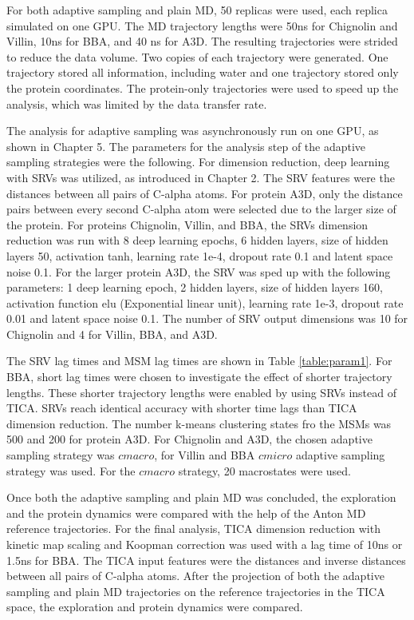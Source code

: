 For both adaptive sampling and plain MD, 50 replicas were used, each replica simulated on one GPU. The MD trajectory lengths were 50ns for Chignolin and Villin, 10ns for BBA, and 40 ns for A3D.  The resulting trajectories were strided to reduce the data volume. Two copies of each trajectory were generated. One trajectory stored all information, including water and one trajectory stored only the protein coordinates. The protein-only trajectories were used to speed up the analysis, which was limited by the data transfer rate.


The analysis for adaptive sampling was asynchronously run on one GPU, as shown in Chapter 5. The parameters for the analysis step of the adaptive sampling strategies were the following.  For dimension reduction, deep learning with SRVs was utilized, as introduced in Chapter 2.
The SRV features were the distances between all pairs of C-alpha atoms. For protein A3D, only the distance pairs between every second C-alpha atom were selected due to the larger size of the protein.  For proteins Chignolin, Villin, and BBA, the SRVs dimension reduction was run with 8 deep learning epochs, 6 hidden layers, size of hidden layers 50, activation tanh, learning rate 1e-4, dropout rate 0.1 and latent space noise 0.1. For the larger protein A3D, the SRV was sped up with the following parameters: 1 deep learning epoch, 2 hidden layers, size of hidden layers 160, activation function elu (Exponential linear unit), learning rate 1e-3, dropout rate 0.01 and latent space noise 0.1. The number of SRV output dimensions was 10 for Chignolin and 4 for Villin, BBA, and A3D. 

The SRV lag times and MSM lag times are shown in Table \ref{table:param1}. For BBA, short lag times were chosen to investigate the effect of shorter trajectory lengths. These shorter trajectory lengths were enabled by using SRVs instead of TICA. SRVs reach identical accuracy with shorter time lags than TICA dimension reduction\cite{chen2019jcp}. The number k-means clustering states fro the MSMs was 500 and 200 for protein A3D. For Chignolin and A3D, the chosen adaptive sampling strategy was $cmacro$, for Villin and BBA $cmicro$ adaptive sampling strategy was used. For the $cmacro$ strategy, 20 macrostates were used.

Once both the adaptive sampling and plain MD was concluded, the exploration and the protein dynamics were compared with the help of the Anton MD reference trajectories. For the final analysis, TICA dimension reduction with kinetic map scaling and Koopman correction was used with a lag time of 10ns or 1.5ns for BBA. The TICA input features were the distances and inverse distances between all pairs of C-alpha atoms. After the projection of both the adaptive sampling and plain MD trajectories on the reference trajectories in the TICA space, the exploration and protein dynamics were compared.

